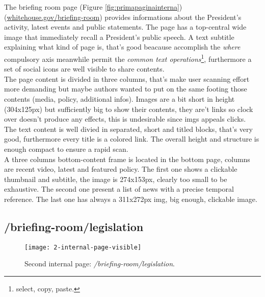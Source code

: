 \documentclass[
12pt, %
a4paper, %
oneside, %
headinclude,footinclude, %
BCOR5mm, %
]{scrartcl}
\begin{document}
	The briefing room page (Figure \ref{fig:primapaginainterna}) (\href{http://www.whitehouse.gov/briefing-room}{whitehouse.gov/briefing-room}) provides informations about the President's activity, latest events and public statements. The page has a top-central wide image that immediately recall a President's public speech. A text subtitle explaining what kind of page is, that's good beacause accomplish the \emph{where} compulsory axis meanwhile permit the \emph{common text operations}\footnote{select, copy, paste.}, furthermore a set of social icons are well visible to share contents. \\
	The page content is divided in three columns, that's make user scanning effort more demanding but maybe authors wanted to put on the same footing those contents (media, policy, additional infos). Images are a bit short in height (304x125px) but sufficiently big to show their contents, they are't links so clock over doesn't produce any effects, this is undesirable since imgs appeals clicks. \\
	The text content is well divied in separated, short and titled blocks, that's very good, furthermore every title is a colored link. The overall height and structure is enough compact to ensure a rapid scan. \\
	A three columns bottom-content frame is located in the bottom page, columns are recent video, latest and featured policy. The first one shows a clickable thumbnail and subtitle, the image is 274x153px, clearly too small to be exhaustive. The second one present a list of news with a precise temporal reference. The last one has always a 311x272px img, big enough, clickable image.

	\newpage
	\subsection{/briefing-room/legislation}

	\begin{figure}[h!]
	\centering 
	\centerline{\texttt{[image: 2-internal-page-visible]}}
	\caption[Second internal page: /briefing-room/legislation]{Second internal page: \emph{/briefing-room/legislation}.}
	\label{fig:secondapaginainterna} 
	\end{figure}
\end{document}
